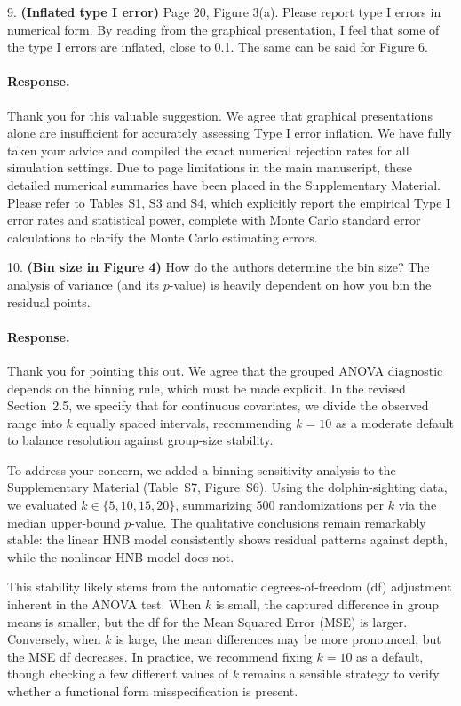 \documentclass[11pt]{article}
\newcommand*{\mybox}[2]{\colorbox{#1!30}{\parbox{.98\linewidth}{#2}}}
\begin{document}
\medskip

\mybox{gray}{9. \textbf{(Inflated type I error)} Page 20, Figure 3(a). Please report type I errors in numerical form. By reading from the graphical presentation, I feel that some of the type I errors are inflated, close to 0.1. The same can be said for Figure 6.}

\paragraph{Response.}
Thank you for this valuable suggestion. We agree that graphical presentations alone are insufficient for accurately assessing Type I error inflation. We have fully taken your advice and compiled the exact numerical rejection rates for all simulation settings. Due to page limitations in the main manuscript, these detailed numerical summaries have been placed in the Supplementary Material. Please refer to Tables S1, S3 and S4, which explicitly report the empirical Type I error rates and statistical power, complete with Monte Carlo standard error calculations to clarify the Monte Carlo estimating errors.

\medskip

\mybox{gray}{10. \textbf{(Bin size in Figure 4)} How do the authors determine the bin size? The analysis of variance (and its $p$-value) is heavily dependent on how you bin the residual points.}

\paragraph{Response.}Thank you for pointing this out. We agree that the grouped ANOVA diagnostic depends on the binning rule, which must be made explicit. In the revised Section~2.5, we specify that for continuous covariates, we divide the observed range into $k$ equally spaced intervals, recommending $k=10$ as a moderate default to balance resolution against group-size stability.

To address your concern, we added a binning sensitivity analysis to the Supplementary Material (Table~S7, Figure~S6). Using the dolphin-sighting data, we evaluated $k \in \{5, 10, 15, 20\}$, summarizing 500 randomizations per $k$ via the median upper-bound $p$-value. The qualitative conclusions remain remarkably stable: the linear HNB model consistently shows residual patterns against depth, while the nonlinear HNB model does not.

This stability likely stems from the automatic degrees-of-freedom (df) adjustment inherent in the ANOVA test. When $k$ is small, the captured difference in group means is smaller, but the df for the Mean Squared Error (MSE) is larger. Conversely, when $k$ is large, the mean differences may be more pronounced, but the MSE df decreases. In practice, we recommend fixing $k=10$ as a default, though checking a few different values of $k$ remains a sensible strategy to verify whether a functional form misspecification is present.
\end{document}
